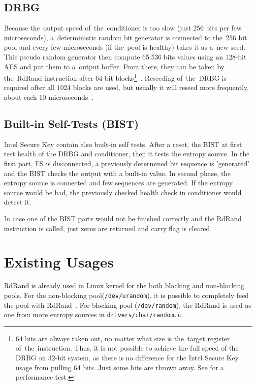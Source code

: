 \subsection{DRBG}\label{subsec:DRBG}
\par{
Because the~output speed of~the~conditioner is too slow (just 256 bits per few 
microseconds), 
a~deterministic random bit generator is connected to the~256 bit pool 
and every few microseconds (if the~pool is healthy) takes it as a~new seed. 
This pseudo random generator then compute 65.536 bits values using 
an 128-bit AES and put them to a~output buffer. 
From there, they can be taken by the~RdRand instruction after 64-bit 
blocks\footnote{64 bits are always taken out, no matter what size is 
the~target register of~the~instruction. Thus, it is not possible to achieve the full 
speed of the DRBG on 32-bit system, as there is no difference for the Intel 
Secure Key usage from pulling 64 bits. Just some bits are thrown away. 
See  for a performance test.}~\cite{AnalysisOfDRNG,UnderstandingRdRandElectronic}. 
Reseeding of~the~DRBG is required after all 1024 blocks are used, 
but usually it will reseed more frequently, 
about each 10 microseconds~\cite[Chapter~4.4]{IntelDRNGGuide}.
}
\subsection{Built-in Self-Tests (BIST)}
\par{
Intel Secure Key contain also built-in self tests. After a reset, the BIST at first test 
health of the DRBG and conditioner, then it tests the entropy source. In the first 
part, ES is disconnected, a previously determined bit sequence is 'generated' 
and the BIST checks the output with a built-in value. In second phase, 
the entropy source is connected and few sequences are generated. 
If the entropy source would be bad, the previously checked health check in conditioner would detect it. 
}

\par{
In case one of the BIST parts would not be finished correctly and the RdRand 
instruction is called, just zeros are returned and carry flag is cleared\cite{AnalysisOfDRNG}.
}

\section{Existing Usages} 
\par{
RdRand is already used in Linux kernel for the both blocking and non-blocking pools. For the non-blocking pool({\tt /dev/urandom}), it is possible to completely feed the pool with RdRand~\cite{KernelRdRand}. For blocking pool ({\tt /dev/random}), the RdRand is used as one from more entropy sources in {\tt drivers/char/random.c}.
}

